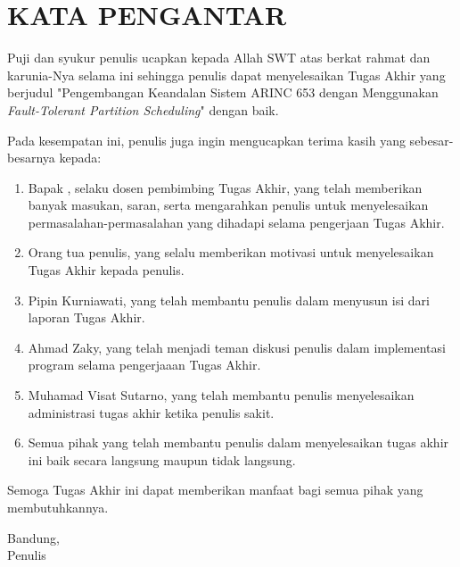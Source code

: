 \chapter*{KATA PENGANTAR}

Puji dan syukur penulis ucapkan kepada Allah SWT atas berkat rahmat dan karunia-Nya
selama ini sehingga penulis dapat menyelesaikan Tugas Akhir yang berjudul "Pengembangan
Keandalan Sistem ARINC 653 dengan Menggunakan \textit{Fault-Tolerant Partition Scheduling}"
dengan baik.

Pada kesempatan ini, penulis juga ingin mengucapkan terima kasih yang sebesar-besarnya kepada:
\begin{enumerate}
	\item Bapak \pembimbing, selaku dosen pembimbing Tugas Akhir, yang telah
		memberikan banyak masukan, saran, serta mengarahkan penulis untuk menyelesaikan
		permasalahan-permasalahan yang dihadapi selama pengerjaan Tugas Akhir.
	\item Orang tua penulis, yang selalu memberikan motivasi untuk menyelesaikan Tugas Akhir
		kepada penulis.
	\item Pipin Kurniawati, yang telah membantu penulis dalam menyusun isi dari laporan
		Tugas Akhir.
	\item Ahmad Zaky, yang telah menjadi teman diskusi penulis dalam implementasi program
		selama pengerjaaan Tugas Akhir.
	\item Muhamad Visat Sutarno, yang telah membantu penulis menyelesaikan administrasi
		tugas akhir ketika penulis sakit.
	\item Semua  pihak  yang  telah  membantu  penulis  dalam  menyelesaikan  tugas akhir
		ini baik secara langsung maupun tidak langsung.
\end{enumerate}

Semoga Tugas Akhir ini dapat memberikan manfaat bagi semua pihak yang membutuhkannya.

\begin{flushright}
	Bandung, \bulan\ \tahun\\[15mm]
	Penulis
\end{flushright}

